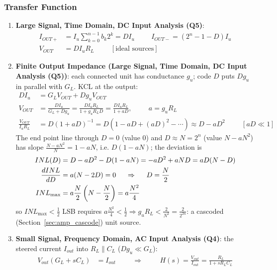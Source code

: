 \subsubsection{Transfer Function}
\begin{enumerate}
  \item \textbf{Large Signal, Time Domain, DC Input Analysis (Q5)}:
    \begin{align*}
      I_{OUT+} &= I_u \sum_{k=0}^{n-1} b_k 2^k = D I_u \hspace{1cm}
      I_{OUT-} = (2^n - 1 - D) I_u \\
      V_{OUT} &= D I_u R_L \hspace{1cm} [\text{ideal sources}]
    \end{align*}
  \item \textbf{Finite Output Impedance (Large Signal, Time Domain, DC Input Analysis (Q5))}:
    each connected unit has conductance \(g_u\); code \(D\) puts \(D g_u\) in
    parallel with \(G_L\). KCL at the output:
    \begin{align*}
      D I_u &= G_L V_{OUT} + D g_u V_{OUT} \\
      V_{OUT} &= \frac{D I_u}{G_L + D g_u} = \frac{D I_u R_L}{1 + g_u R_L D} = \frac{D I_u R_L}{1 + a D}, \hspace{1cm} a = g_u R_L \\
      \frac{V_{OUT}}{I_u R_L} &= D (1 + aD)^{-1} = D\left(1 - aD + (aD)^2 - \cdots\right) \approx D - a D^2 \hspace{1cm} [aD \ll 1]
    \end{align*}
    The end point line through \(D = 0\) (value 0) and \(D \approx N = 2^n\)
    (value \(N - aN^2\)) has slope \(\frac{N - aN^2}{N} = 1 - aN\), i.e.
    \(D(1 - aN)\); the deviation is
    \begin{align*}
      INL(D) &= D - aD^2 - D(1 - aN) = - aD^2 + aND = a D (N - D) \\
      \frac{dINL}{dD} &= a(N - 2D) = 0 \hspace{0.5cm} \Rightarrow \hspace{0.5cm} D = \frac{N}{2} \\
      INL_{\max} &= a \frac{N}{2}\left(N - \frac{N}{2}\right) = a \frac{N^2}{4}
    \end{align*}
    so \(INL_{\max} < \frac{1}{2}\) LSB requires
    \(a\frac{N^2}{4} < \frac{1}{2} \Rightarrow g_u R_L < \frac{2}{N^2} = \frac{2}{2^{2n}}\): a
    cascoded (Section~\ref{sec:amp_cascode}) unit source.
  \item \textbf{Small Signal, Frequency Domain, AC Input Analysis (Q4)}: the steered current
    \(I_{out}\) into \(R_L \parallel C_L\) (\(D g_u \ll G_L\)):
    \begin{align*}
      V_{out}(G_L + sC_L) &= I_{out} \hspace{1cm} \Rightarrow \hspace{1cm}
      H(s) = \frac{V_{out}}{I_{out}} = \frac{R_L}{1 + sR_L C_L} \tag{1}
    \end{align*}
\end{enumerate}

